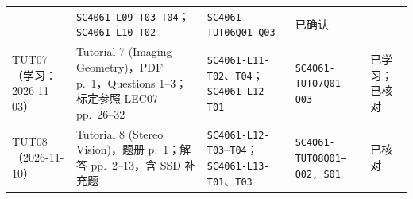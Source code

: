 \begin{tabularx}{\textwidth}{@{}>{\raggedright\arraybackslash}p{2.35cm}>{\raggedright\arraybackslash}X>{\raggedright\arraybackslash}p{3.15cm}>{\raggedright\arraybackslash}p{3.15cm}>{\raggedright\arraybackslash}p{1.25cm}@{}}
  & \texttt{SC4061-L09-T03}--\texttt{T04}；\newline\texttt{SC4061-L10-T02}
  & \texttt{SC4061-TUT06}\newline\texttt{Q01--Q03}
  & 已确认 \\
  TUT07（学习：2026-11-03） & Tutorial 7 (Imaging Geometry)，PDF p.~1，Questions 1--3；标定参照 LEC07 pp.~26--32
  & \texttt{SC4061-L11-T02}、\texttt{T04}；\texttt{SC4061-L12-T01}
  & \texttt{SC4061-TUT07}\newline\texttt{Q01--Q03}
  & 已学习；已核对 \\
  TUT08（2026-11-10） & Tutorial 8 (Stereo Vision)，题册 p.~1；解答 pp.~2--13，含 SSD 补充题
  & \texttt{SC4061-L12-T03}--\texttt{T04}；\texttt{SC4061-L13-T01}、\texttt{T03}
  & \texttt{SC4061-TUT08}\newline\texttt{Q01--Q02, S01}
  & 已核对 \\
  \bottomrule
\end{tabularx}
\endgroup
